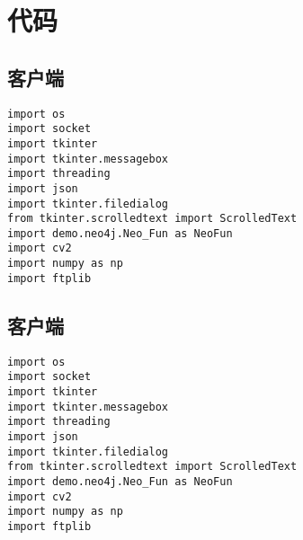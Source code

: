 \documentclass[forprint]{software}
\begin{document}
\clearpage
\appendix


\chapter{代码}

\section{客户端}

\begin{lstlisting}
import os
import socket
import tkinter
import tkinter.messagebox
import threading
import json
import tkinter.filedialog
from tkinter.scrolledtext import ScrolledText
import demo.neo4j.Neo_Fun as NeoFun
import cv2
import numpy as np
import ftplib
\end{lstlisting}

\section{客户端}
\begin{lstlisting}
import os
import socket
import tkinter
import tkinter.messagebox
import threading
import json
import tkinter.filedialog
from tkinter.scrolledtext import ScrolledText
import demo.neo4j.Neo_Fun as NeoFun
import cv2
import numpy as np
import ftplib
\end{lstlisting}
\end{document}
